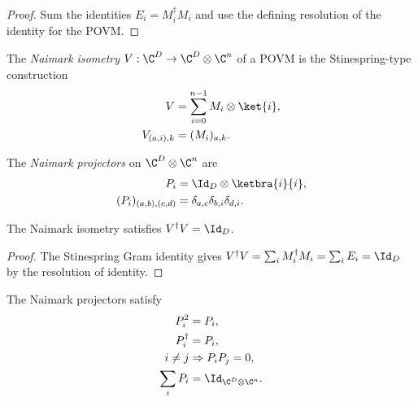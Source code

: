 \begin{proof}\leanok
    Sum the identities $E_i=M_i^\dagger M_i$ and use the defining
    resolution of the identity for the POVM.
\end{proof}

\begin{definition}\label{def:naimark_isometry}
    \leanok
    The \emph{Naimark isometry} $V:\C^D\to\C^D\otimes\C^n$ of a POVM
    is the Stinespring-type construction
    \begin{align}
        V
        &=\sum_{i=0}^{n-1}M_i\otimes\ket{i},
        \notag\\
        V_{(a,i),k}
        &=(M_i)_{a,k}.
        \label{eq:representations_naimark_isometry}
    \end{align}
\end{definition}

\begin{definition}\label{def:naimark_projection}
    \leanok
    The \emph{Naimark projectors} on $\C^D\otimes\C^n$ are
    \begin{align}
        P_i
        &=\Id_D\otimes\ketbra{i}{i},
        \notag\\
        (P_i)_{(a,b),(c,d)}
        &=\delta_{a,c}\delta_{b,i}\delta_{d,i}.
        \label{eq:representations_naimark_projectors}
    \end{align}
\end{definition}

\begin{theorem}\label{thm:naimark_isometry_isometry}
    \leanok
    The Naimark isometry satisfies $V^\dagger V=\Id_D$.
\end{theorem}

\begin{proof}
    \leanok
    The Stinespring Gram identity gives
    $V^\dagger V=\sum_iM_i^\dagger M_i=\sum_iE_i=\Id_D$
    by the resolution of identity.
\end{proof}

\begin{theorem}
    \label{thm:naimark_projection_axioms}
    \leanok
    The Naimark projectors satisfy
    \begin{align}
        P_i^2
        &=P_i,
        \notag\\
        P_i^\dagger
        &=P_i,
        \notag\\
        i\ne j
        &\Rightarrow P_iP_j=0,
        \notag\\
        \sum_iP_i
        &=\Id_{\C^D\otimes\C^n}.
        \notag
    \end{align}
\end{theorem}

